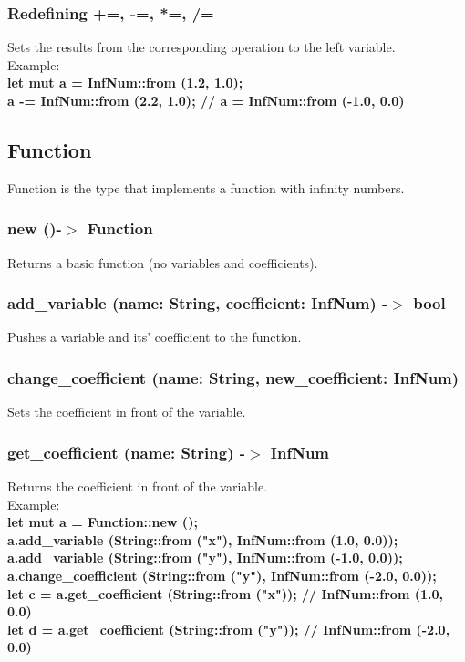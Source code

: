 \documentclass[]{article}
\begin{document}
				\subsubsection{Redefining +=, -=, *=, /=}
					Sets the results from the corresponding operation to the left variable.\\Example:\\
					\large{\textbf{let mut a = InfNum::from (1.2, 1.0);\\
						a -= InfNum::from (2.2, 1.0); // a = InfNum::from (-1.0, 0.0)}}

			\subsection{Function}
				\Large{Function is the type that implements a function with infinity numbers.}
				\subsubsection{new ()-$>$ Function}
					Returns a basic function (no variables and coefficients).
				\subsubsection{add\_variable (name: String, coefficient: InfNum) -$>$ bool}
					Pushes a variable and its' coefficient to the function.
				\subsubsection{change\_coefficient (name: String, new\_coefficient: InfNum)}
					Sets the coefficient in front of the variable.
				\subsubsection{get\_coefficient (name: String) -$>$ InfNum}
					Returns the coefficient in front of the variable.\\Example:\\
					\large{\textbf{let mut a = Function::new ();\\
						a.add\_variable (String::from ("x"), InfNum::from (1.0, 0.0));\\
						a.add\_variable (String::from ("y"), InfNum::from (-1.0, 0.0));\\
						a.change\_coefficient (String::from ("y"), InfNum::from (-2.0, 0.0));\\
						let c = a.get\_coefficient (String::from ("x")); // InfNum::from (1.0, 0.0)\\
						let d = a.get\_coefficient (String::from ("y")); // InfNum::from (-2.0, 0.0)\\}}
\end{document}
